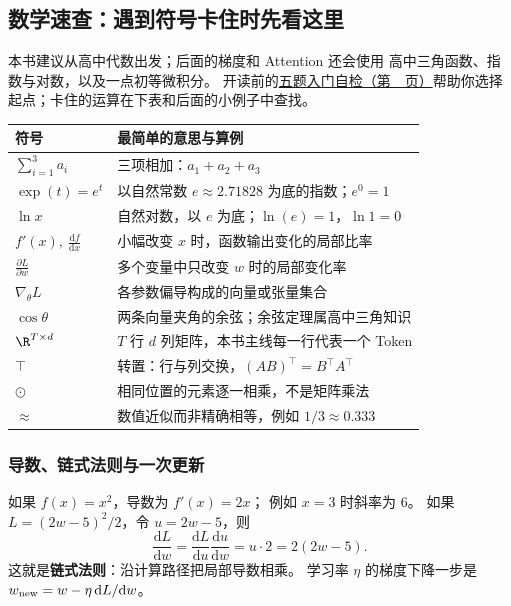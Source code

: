 \subsection{数学速查：遇到符号卡住时先看这里}
\label{app:math-tools}
本书建议从高中代数出发；后面的梯度和 Attention 还会使用
高中三角函数、指数与对数，以及一点初等微积分。
开读前的\hyperref[app:math-entry]{五题入门自检（第~\pageref*{app:math-entry}~页）}帮助你选择起点；卡住的运算在下表和后面的小例子中查找。

\begin{center}
\small
\renewcommand{\arraystretch}{1.36}
\begin{tabularx}{\linewidth}{@{}p{31mm}X@{}}
\toprule
符号 & 最简单的意思与算例\\
\midrule
$\sum_{i=1}^3 a_i$ & 三项相加：$a_1+a_2+a_3$\\
$\exp(t)=e^t$ & 以自然常数 $e\approx2.71828$ 为底的指数；$e^0=1$\\
$\ln x$ & 自然对数，以 $e$ 为底；$\ln(e)=1$，$\ln1=0$\\
$f'(x),\ \frac{\mathrm df}{\mathrm dx}$ & 小幅改变 $x$ 时，函数输出变化的局部比率\\
$\frac{\partial L}{\partial w}$ & 多个变量中只改变 $w$ 时的局部变化率\\
$\nabla_{\!\theta}L$ & 各参数偏导构成的向量或张量集合\\
$\cos\theta$ & 两条向量夹角的余弦；余弦定理属高中三角知识\\
$\R^{T\times d}$ & $T$ 行 $d$ 列矩阵，本书主线每一行代表一个 Token\\
$\top$ & 转置：行与列交换，$(AB)^\top=B^\top A^\top$\\
$\odot$ & 相同位置的元素逐一相乘，不是矩阵乘法\\
$\approx$ & 数值近似而非精确相等，例如 $1/3\approx0.333$\\
\bottomrule
\end{tabularx}
\end{center}

\subsubsection*{导数、链式法则与一次更新}

如果 $f(x)=x^2$，导数为 $f'(x)=2x$；
例如 $x=3$ 时斜率为 $6$。
如果 $L=(2w-5)^2/2$，令 $u=2w-5$，则
\[
\frac{\mathrm dL}{\mathrm dw}
=\frac{\mathrm dL}{\mathrm du}\frac{\mathrm du}{\mathrm dw}
=u\cdot2=2(2w-5).
\]
这就是\textbf{链式法则}：沿计算路径把局部导数相乘。
学习率 $\eta$ 的梯度下降一步是
$w_{\rm new}=w-\eta\,\mathrm dL/\mathrm dw$。

